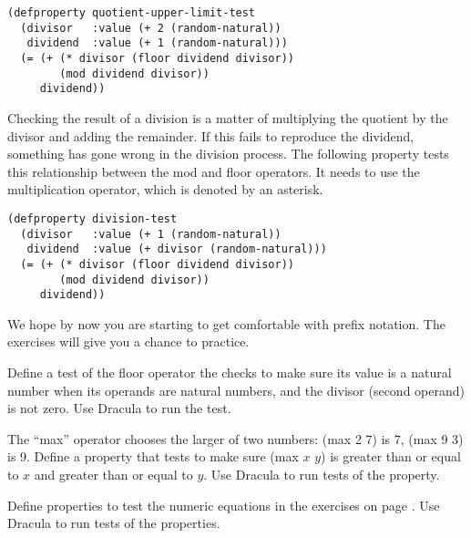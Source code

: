 \label{quotient-upper-limit-test}
\begin{lstlisting}
(defproperty quotient-upper-limit-test
  (divisor   :value (+ 2 (random-natural))
   dividend  :value (+ 1 (random-natural)))
  (= (+ (* divisor (floor dividend divisor))
        (mod dividend divisor))
     dividend))
\end{lstlisting}

Checking the result of a division is a matter of multiplying the quotient by the divisor and adding the remainder. If this fails to reproduce the dividend, something has gone wrong in the division process. The following property tests this relationship between the mod and floor operators. It needs to use the multiplication operator, which is denoted by an asterisk.

\begin{lstlisting}
(defproperty division-test
  (divisor   :value (+ 1 (random-natural))
   dividend  :value (+ divisor (random-natural)))
  (= (+ (* divisor (floor dividend divisor))
        (mod dividend divisor))
     dividend))
\end{lstlisting}

We hope by now you are starting to get comfortable with prefix notation. The exercises will give you a chance to practice.

\begin{ExerciseList}
\Exercise Define a test of the floor operator the checks to make sure its value is a natural number when its operands are natural numbers, and the divisor (second operand) is not zero. Use Dracula to run the test.

\Exercise The ``max'' operator chooses the larger of two numbers: (max 2 7) is 7, (max 9 3) is 9.
Define a property that tests to make sure (max $x$ $y$) is greater than or equal to $x$ and greater than or equal to $y$.
Use Dracula to run tests of the property.

\Exercise
Define properties to test the numeric equations in the exercises on page \pageref{ex:ch02-intro}.
Use Dracula to run tests of the properties.
\end{ExerciseList}

